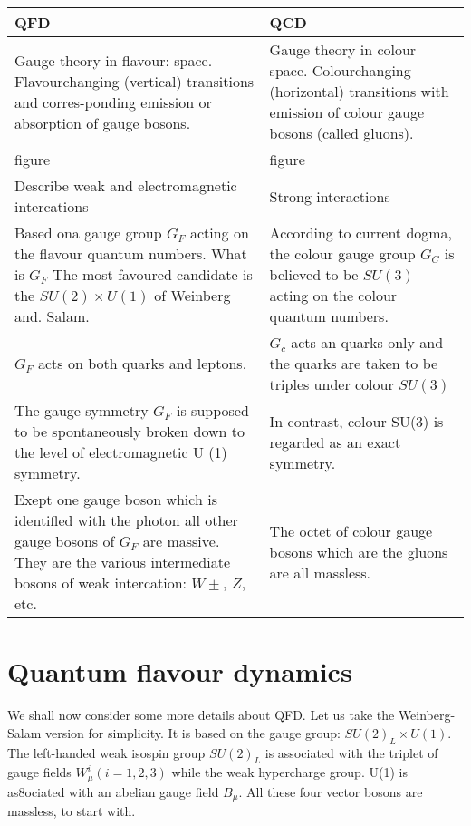 \begin{center}
\begin{tabular}	{|m{}|m{}|}
\hline
\hspace{2.3cm}QFD & \hspace{2.3cm}QCD\\
\hline
Gauge theory in flavour: space. Flavourchanging (vertical) transitions and corres-ponding emission or absorption of gauge bosons.& Gauge theory in colour space. Colourchanging (horizontal) transitions with emission of colour gauge bosons (called gluons). \\
 figure & figure\\
 \hline
 Describe weak and electromagnetic intercations & Strong interactions\\
 \hline
 Based ona gauge group $G_{F}$ acting on the flavour quantum numbers. What is $G_{F}$ The most favoured candidate is the $SU(2) \times  U(1)$ of Weinberg and. Salam. & According to current dogma, the colour gauge group $G_{C}$ is believed to be $SU(3)$ acting on the colour quantum numbers.\\
 \hline
 $G_{F}$ acts on both quarks and leptons. & $G_{c}$ acts an quarks only and the quarks are taken to be triples under colour $SU(3)$\\
 \hline
 The gauge symmetry $G_{F}$ is supposed to be spontaneously broken down to the level of electromagnetic U (1) symmetry. & In contrast, colour SU(3) is regarded as an exact symmetry.\\
 \hline
 Exept one gauge boson which is identifled with the photon all other gauge bosons of $G_{F}$ are massive. They are the various intermediate bosons of weak intercation: $W\pm$, $Z$, etc. & The octet of colour gauge bosons which are the gluons are all massless.\\
 \hline
\end{tabular}
\end{center}

\section{Quantum flavour dynamics}

We shall now consider some more details about QFD. Let us take the 
Weinberg-Salam version for simplicity. It is based on the gauge group:
$SU(2)_{L} \times U(1)$. The left-handed weak isospin group $SU(2)_{L}$ is associated
with the triplet of gauge fields $W_{\mu}^{i} (i = 1, 2, 3)$ while the weak hypercharge
group. U(1) is as8ociated with an abelian gauge field $B_{\mu}$. All these four
vector bosons are massless, to start with. 

